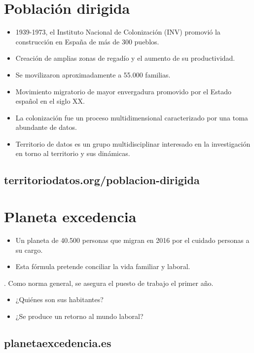 \documentclass[11pt]{article}
\begin{document}
\section*{Población dirigida}
\label{sec:org31af1b0}
\begin{itemize}
\item 1939-1973, el Instituto Nacional de Colonización (INV) promovió la construcción en España de más de 300 pueblos.
\item Creación de amplias zonas de regadío y el aumento de su productividad.
\item Se movilizaron aproximadamente a 55.000 familias.
\item Movimiento migratorio de mayor envergadura promovido por el Estado español en el siglo XX.
\item La colonización fue un proceso multidimensional caracterizado por una toma abundante de datos.
\item Territorio de datos es un grupo multidisciplinar interesado en la investigación en torno al territorio y sus dinámicas.
\end{itemize}

\subsection*{territoriodatos.org/poblacion-dirigida}
\label{sec:org0224330}

\section*{Planeta excedencia}
\label{sec:orgf3f8695}
\begin{itemize}
\item Un planeta de 40.500 personas que migran en 2016 por el cuidado personas a su cargo.
\item Esta fórmula pretende conciliar la vida familiar y laboral.
\end{itemize}
. Como norma general, se asegura el puesto de trabajo el primer año.
\begin{itemize}
\item ¿Quiénes son sus habitantes?
\item ¿Se produce un retorno al mundo laboral?
\end{itemize}
\subsection*{planetaexcedencia.es}
\label{sec:org0486037}
\end{document}
